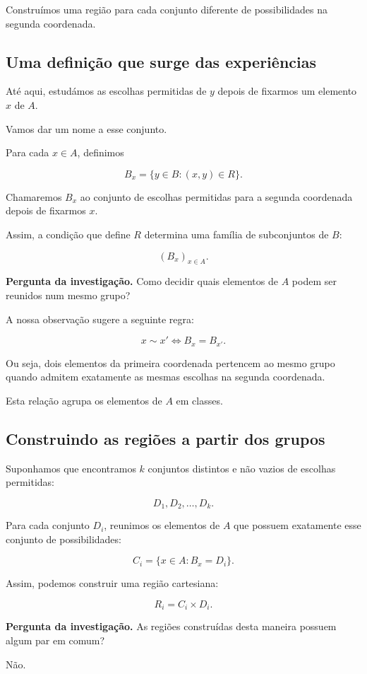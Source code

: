 \documentclass[11pt,a4paper,oneside]{book}
\newcommand{\Pergunta}[1]{\begin{perguntabox}\textbf{Pergunta da investigação.} #1\end{perguntabox}}
\begin{document}
Construímos uma região para
cada conjunto diferente de
possibilidades na segunda coordenada.

\subsection*{Uma definição que surge das experiências}

Até aqui, estudámos as escolhas
permitidas de $y$ depois de
fixarmos um elemento $x$ de $A$.

Vamos dar um nome a esse conjunto.

Para cada $x\in A$, definimos

\[
\boxed{
B_x=\{y\in B:(x,y)\in R\}
}.
\]

Chamaremos $B_x$ ao conjunto
de escolhas permitidas para a
segunda coordenada depois
de fixarmos $x$.

Assim, a condição que define
$R$ determina uma família
de subconjuntos de $B$:

\[
(B_x)_{x\in A}.
\]

\Pergunta{Como decidir quais elementos
de $A$ podem ser reunidos
num mesmo grupo?}

A nossa observação sugere
a seguinte regra:

\[
\boxed{
x\sim x'
\iff B_x=B_{x'}
}.
\]

Ou seja, dois elementos da
primeira coordenada pertencem
ao mesmo grupo quando admitem
exatamente as mesmas escolhas
na segunda coordenada.

Esta relação agrupa os elementos
de $A$ em classes.

\subsection*{Construindo as regiões a partir dos grupos}

Suponhamos que encontramos
$k$ conjuntos distintos e não vazios
de escolhas permitidas:

\[
D_1,D_2,\ldots,D_k.
\]

Para cada conjunto $D_i$,
reunimos os elementos de $A$
que possuem exatamente esse
conjunto de possibilidades:

\[
C_i=\{x\in A:B_x=D_i\}.
\]

Assim, podemos construir
uma região cartesiana:

\[
R_i=C_i\times D_i.
\]

\Pergunta{As regiões construídas
desta maneira possuem
algum par em comum?}

Não.
\end{document}
